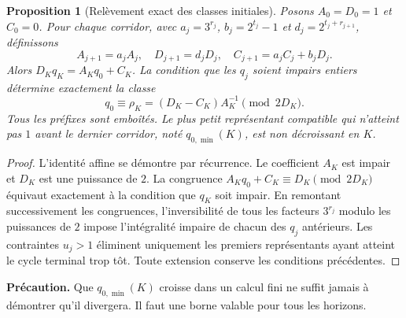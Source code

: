 \documentclass[11pt,a4paper]{article}
\newtheorem{proposition}[theoreme]{Proposition}
\begin{document}
\begin{proposition}[Relèvement exact des classes initiales]\label{prop:classe}
Posons $A_0=D_0=1$ et $C_0=0$. Pour chaque corridor, avec $a_j=3^{r_j}$, $b_j=2^{t_j}-1$ et $d_j=2^{t_j+r_{j+1}}$, définissons
\[
A_{j+1}=a_jA_j,\quad D_{j+1}=d_jD_j,\quad C_{j+1}=a_jC_j+b_jD_j.
\]
Alors $D_Kq_K=A_Kq_0+C_K$. La condition que les $q_j$ soient impairs entiers détermine exactement la classe
\begin{equation}\label{eq:rho}
\boxed{\displaystyle q_0\equiv\rho_K=(D_K-C_K)A_K^{-1}\pmod{2D_K}.}
\end{equation}
Tous les préfixes sont emboîtés. Le plus petit représentant compatible qui n'atteint pas $1$ avant le dernier corridor, noté $q_{0,\min}(K)$, est non décroissant en $K$.
\end{proposition}
\begin{proof}
L'identité affine se démontre par récurrence. Le coefficient $A_K$ est impair et $D_K$ est une puissance de $2$. La congruence $A_Kq_0+C_K\equiv D_K\pmod{2D_K}$ équivaut exactement à la condition que $q_K$ soit impair. En remontant successivement les congruences, l'inversibilité de tous les facteurs $3^{r_j}$ modulo les puissances de $2$ impose l'intégralité impaire de chacun des $q_j$ antérieurs. Les contraintes $u_j>1$ éliminent uniquement les premiers représentants ayant atteint le cycle terminal trop tôt. Toute extension conserve les conditions précédentes.
\end{proof}
\textbf{Précaution.} Que $q_{0,\min}(K)$ croisse dans un calcul fini ne suffit jamais à démontrer qu'il divergera. Il faut une borne valable pour tous les horizons.
\end{document}
